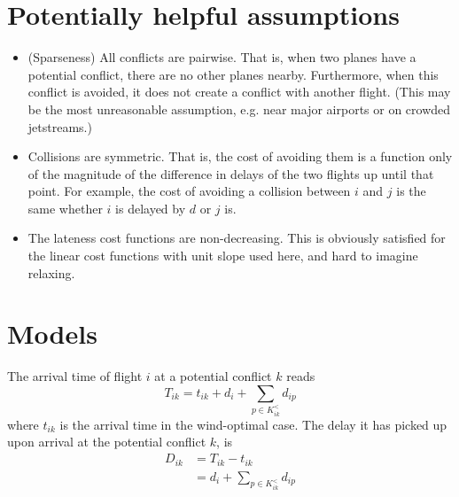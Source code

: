 \documentclass{article}
\begin{document}
\section{Potentially helpful assumptions}
\begin{itemize}
  \item (Sparseness) All conflicts are pairwise. That is, when two planes have a potential conflict, there are no other planes nearby. 
    Furthermore, when this conflict is avoided, it does not create a conflict with another flight. 
    (This may be the most unreasonable assumption, e.g. near major airports or on crowded jetstreams.)
  \item Collisions are symmetric. That is, the cost of avoiding them is a function only of the magnitude of the difference in delays of the two flights up until that point. For example, the cost of avoiding a collision between $i$ and $j$ is the same whether $i$ is delayed by $d$ or $j$ is.
  \item The lateness cost functions are non-decreasing.
    This is obviously satisfied for the linear cost functions with unit slope used
    here, and hard to imagine relaxing.
\end{itemize}

\section{Models}
\label{sec:models}
The arrival time of flight $i$ at a potential conflict $k$ reads 
\begin{equation*}
  T_{ik} = t_{ik} + d_i + \sum_{p \in K^<_{ik}} d_{ip}
\end{equation*}
where $t_{ik}$ is the arrival time in the wind-optimal case.
The delay it has picked up upon arrival at the potential conflict $k$, is
\begin{align*}
  D_{ik} &= T_{ik} - t_{ik} \\
  &= d_i + \sum_{p \in K^<_{ik}} d_{ip}
\end{align*}
\end{document}
